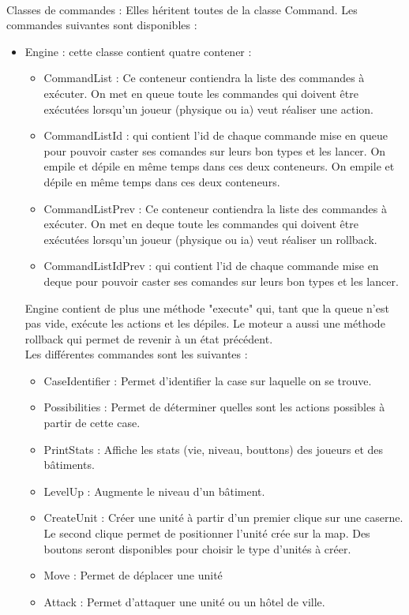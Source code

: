 \documentclass[12pt,a4paper]{article}
\begin{document}
\\Classes de commandes : Elles héritent toutes de la classe Command. Les commandes suivantes sont disponibles :
\begin{itemize}
\item Engine : cette classe contient quatre contener : \begin{itemize}
    \item CommandList : Ce conteneur contiendra la liste des commandes à exécuter. On met en queue toute les commandes qui doivent être exécutées lorsqu'un joueur (physique ou ia) veut réaliser une action.
    \item CommandListId : qui contient l'id de chaque commande mise en queue pour pouvoir caster ses comandes sur leurs bon types et les lancer. On empile et dépile en même temps dans ces deux conteneurs. 
    On empile et dépile en même temps dans ces deux conteneurs. 
    \item CommandListPrev : Ce conteneur contiendra la liste des commandes à exécuter. On met en deque toute les commandes qui doivent être exécutées lorsqu'un joueur (physique ou ia) veut réaliser un rollback.
    \item CommandListIdPrev : qui contient l'id de chaque commande mise en deque pour pouvoir caster ses comandes sur leurs bon types et les lancer. 
\end{itemize}
Engine contient de plus une méthode "execute" qui, tant que la queue n'est pas vide, exécute les actions et les dépiles. Le moteur a aussi une méthode rollback qui permet de revenir à un état précédent.
\\Les différentes commandes sont les suivantes : 
    \begin{itemize}
        \item CaseIdentifier : Permet d'identifier la case sur laquelle on se trouve.
        \item Possibilities : Permet de déterminer quelles sont les actions possibles à partir de cette case.
        \item PrintStats : Affiche les stats (vie, niveau, bouttons) des joueurs et des bâtiments.
        \item LevelUp : Augmente le niveau d'un bâtiment.
        \item CreateUnit : Créer une unité à partir d'un premier clique sur une caserne. Le second clique permet de positionner l'unité crée sur la map. Des boutons seront disponibles pour choisir le type d'unités à créer.
        \item Move : Permet de déplacer une unité
        \item Attack : Permet d'attaquer une unité ou un hôtel de ville.
    \end{itemize}
\end{itemize}
\end{document}
